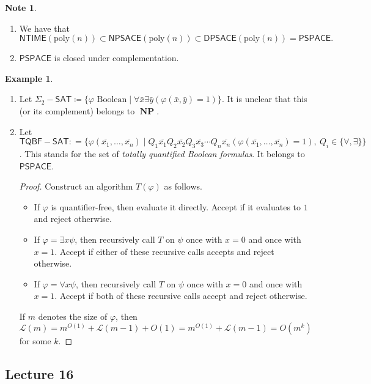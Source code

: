 \documentclass[10pt,letterpaper,cm]{nupset}
\theoremstyle{definition}
\newtheorem{exmp}[definition]{Example}
\newtheorem{note}[definition]{Note}
\theoremstyle{theorem}
\theoremstyle{remark}
\newcommand{\1}{\mathbf{1}}
\newcommand{\0}{\vec 0}
\DeclareMathOperator{\NP}{\mathbf{NP}}
\begin{document}
\begin{note} $ $
\begin{enumerate}
\item We have that $\mathsf{NTIME}(\text{poly}(n)) \subset \mathsf{NPSACE}(\text{poly}(n)) \subset \mathsf{DPSACE}(\text{poly}(n)) = \mathsf{PSPACE}.$
\item $\mathsf{PSPACE}$ is closed under complementation. 
\end{enumerate}
\end{note}

\begin{exmp} $ $
\begin{enumerate}
\item Let $\Sigma_2{-}\mathsf{SAT} \coloneqq \{\varphi \text{ Boolean} \mid \forall \bar{x} \exists \bar{y}(\varphi(\bar{x}, \bar{y}) = 1)\}$. It is unclear that this (or its complement) belongs to $\NP$. 
\item Let $\mathsf{TQBF{-}SAT} : = \{ \varphi(\overline{x_1}, \ldots, \overline{x_n}) \mid Q_1 \overline{x_1} Q_2 \overline{x_2}Q_3 \overline{x_3} \cdots Q_n \overline{x_n} (\varphi(\overline{x_1}, \ldots, \overline{x_n}) = 1), \ Q_i \in \{\forall, \exists\} \}$. This stands for the set of \textit{totally quantified Boolean formulas}. It belongs to $\mathsf{PSPACE}$.
\begin{proof}
Construct an algorithm $T(\varphi)$ as follows. 
\begin{itemize}
\item If $\varphi$ is quantifier-free, then evaluate it directly. Accept if it evaluates to $1$ and reject otherwise. 
\item If $\varphi = \exists x \psi$, then recursively call $T$ on $\psi$ once with $x=0$ and once with $x=1$. Accept if either of these recursive calls accepts and reject otherwise. 
\item If  $\varphi = \forall x \psi$, then recursively call $T$ on $\psi$ once with $x=0$ and once with $x=1$. Accept if both of these recursive calls accept and reject otherwise. 
\end{itemize} 
If $m$ denotes the size of $\varphi$, then $\mathcal{L}(m) = m^{O(1)} + \mathcal{L}(m-1) + O(1) = m^{O(1)} + \mathcal{L}(m-1) = O(m^k)$ for some $k$.
\end{proof}
\end{enumerate}
\end{exmp}

\subsection{Lecture 16}
\end{document}
